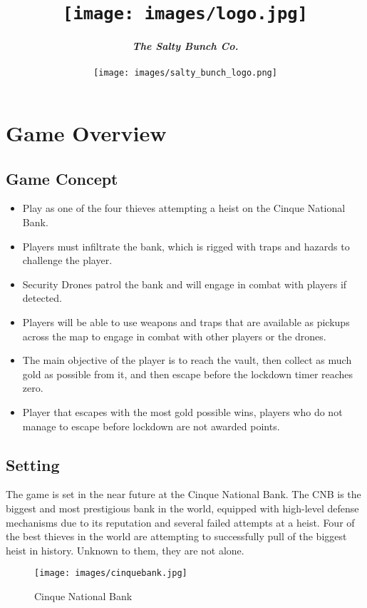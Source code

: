 \documentclass[10pt]{report}
\title{\texttt{[image: images/logo.jpg]}}
\author{\textbf{\textit{The Salty Bunch Co.}}\\\\\texttt{[image: images/salty\_bunch\_logo.png]}}
\date{}
\begin{document}
\maketitle
\tableofcontents

\chapter{Game Overview}

\section{Game Concept}

\begin{itemize}
    \item Play as one of the four thieves attempting a heist on the Cinque National Bank.
    \item Players must infiltrate the bank, which is rigged with traps and hazards to challenge the player.
    \item Security Drones patrol the bank and will engage in combat with players if detected.
    \item Players will be able to use weapons and traps that are available as pickups across the map to engage in combat with other players or the drones.
    \item The main objective of the player is to reach the vault, then collect as much gold as possible from it, and then escape before the lockdown timer reaches zero.
    \item Player that escapes with the most gold possible wins, players who do not manage to escape before lockdown are not awarded points.
\end{itemize}

\section{Setting}

The game is set in the near future at the Cinque National Bank. The CNB is the biggest and most prestigious bank in the world, equipped with high-level defense mechanisms due to its reputation and several failed attempts at a heist. Four of the best thieves in the world are attempting to successfully pull of the biggest heist in history. Unknown to them, they are not alone.

\begin{figure}[H]
    \centering
    \texttt{[image: images/cinquebank.jpg]}
    \caption{Cinque National Bank}
\end{figure}
\end{document}
